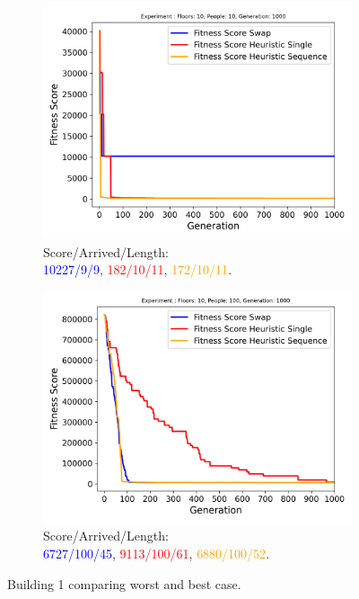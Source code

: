\begin{figure}[ht]
	\centering
	\begin{subfigure}[b]{0.49\linewidth}
		\centering
		\includegraphics[width=\linewidth]{results/Building1/Mutation_0.1/Floors__10,_People__10,_Generation__1000_worst.png}
		\captionsetup{justification=centering,font=tiny}
		\caption{Score/Arrived/Length:\\\textcolor{blue}{10227/9/9}, \textcolor{red}{182/10/11}, \textcolor{orange}{172/10/11}.}
		\label{fig:Building1 worst}
	\end{subfigure}
	\hfill
	\begin{subfigure}[b]{0.49\linewidth}
		\centering
		\includegraphics[width=\linewidth]{results/Building1/Mutation_0.1/Floors__10,_People__100,_Generation__1000.png}
		\captionsetup{justification=centering,font=tiny}
		\caption{Score/Arrived/Length:\\\textcolor{blue}{6727/100/45}, \textcolor{red}{9113/100/61}, \textcolor{orange}{6880/100/52}.}
		\label{fig:Building1 100 people}
	\end{subfigure}
	\captionsetup{font=scriptsize}
	\caption{Building 1 comparing worst and best case.}
	\label{fig:Building1 results}
\end{figure}

